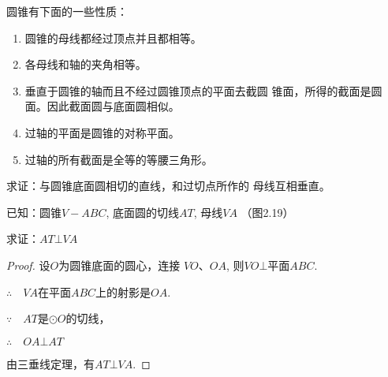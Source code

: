 圆锥有下面的一些性质：
\begin{enumerate}
\item 圆锥的母线都经过顶点并且都相等。
\item 各母线和轴的夹角相等。
\item 垂直于圆锥的轴而且不经过圆锥顶点的平面去截圆
锥面，所得的截面是圆面。因此截面圆与底面圆相似。
\item 过轴的平面是圆锥的对称平面。
\item 过轴的所有截面是全等的等腰三角形。
\end{enumerate}


\begin{example}
求证：与圆锥底面圆相切的直线，和过切点所作的
母线互相垂直。

已知：圆锥$V-ABC$, 底面圆的切线$AT$, 母线$VA$
（图2.19）

\begin{figure}[htp]
    \centering
{}
    \caption{}
\end{figure}

求证：$AT\bot VA$
\end{example}

\begin{proof}
设$O$为圆锥底面的圆心，连接
$VO$、$OA$, 则$VO\bot$平面$ABC$.

$\therefore\quad VA$在平面$ABC$上的射影是$OA$.

$\because\quad AT$是$\odot O$的切线，

$\therefore\quad OA\bot AT$

由三垂线定理，有$AT\bot VA$.
\end{proof}

